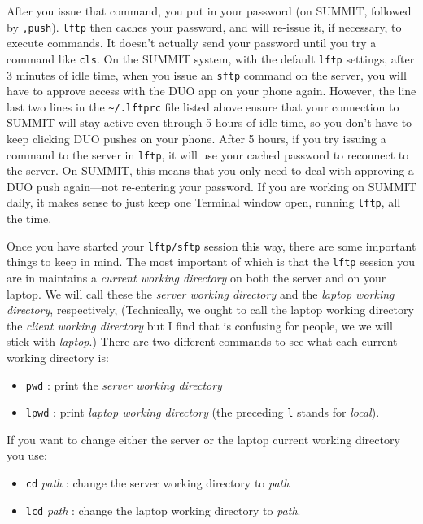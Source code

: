 \documentclass[]{krantz}
\providecommand{\tightlist}{%
  \setlength{\itemsep}{0pt}\setlength{\parskip}{0pt}}
\begin{document}
After you issue that command, you put in your password (on SUMMIT, followed by \texttt{,push}). \texttt{lftp} then caches your
password, and will re-issue it, if necessary, to execute commands. It doesn't actually send your
password until you try a command like \texttt{cls}. On the SUMMIT system, with the default \texttt{lftp} settings,
after 3 minutes of idle time, when you issue an \texttt{sftp} command on the server, you will have to approve
access with the DUO app on your phone again. However, the line last two lines in the
\texttt{\textasciitilde{}/.lftprc} file listed above ensure that your connection to SUMMIT will stay active even
through 5 hours of idle time, so you don't have to keep clicking DUO pushes on your phone.
After 5 hours, if you try issuing a command to the server in \texttt{lftp}, it will use your cached
password to reconnect to the server. On SUMMIT, this means that you only need to deal with
approving a DUO push again---not re-entering your password. If you are working on SUMMIT daily,
it makes sense to just keep one Terminal window open, running \texttt{lftp}, all the time.

Once you have started your \texttt{lftp/sftp} session this way, there are some important things to keep in mind.
The most important of which is that the \texttt{lftp} session you are in maintains a \emph{current working directory}
on both the server and on your laptop. We will call these the \emph{server working directory} and
the \emph{laptop working directory}, respectively, (Technically, we ought to call the laptop working directory the \emph{client working directory}
but I find that is confusing for people, we we will stick with \emph{laptop}.)
There are two different commands to see what each
current working directory is:

\begin{itemize}
\tightlist
\item
  \texttt{pwd} : print the \emph{server working directory}
\item
  \texttt{lpwd} : print \emph{laptop working directory} (the preceding \texttt{l} stands
  for \emph{local}).
\end{itemize}

If you want to change either the server or the laptop current working directory you use:

\begin{itemize}
\tightlist
\item
  \texttt{cd} \emph{path} : change the server working directory to \emph{path}
\item
  \texttt{lcd} \emph{path} : change the laptop working directory to \emph{path}.
\end{itemize}
\end{document}

